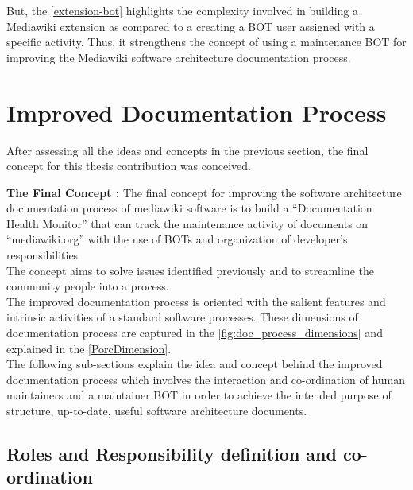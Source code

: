 \begin{enumerate}
But, the \autoref{extension-bot} highlights the complexity involved in building a Mediawiki extension as compared to a creating a BOT user assigned with a specific activity. Thus, it strengthens the concept of using a maintenance BOT for improving the Mediawiki software architecture documentation process.
\end{enumerate}

\section{Improved Documentation Process}
\indent After assessing all the ideas and concepts in the previous section, the final concept for this thesis contribution was conceived.

\textbf{The Final Concept : }
\newline
\indent The final concept for improving the software architecture documentation process of mediawiki software is to build  a \enquote{Documentation Health Monitor} that can track the maintenance activity of documents on \enquote{mediawiki.org} with the use of BOTs and organization of developer's responsibilities
\\\indent The concept aims to solve issues identified previously and to streamline the community people into a process.
\\\indent The improved documentation process is oriented with the salient features and intrinsic activities of a standard software processes. These dimensions of documentation process are captured in the \autoref{fig:doc_process_dimensions} and explained in the \autoref{PorcDimension}.
\\\indent The following sub-sections explain the idea and concept behind the improved documentation process which involves the interaction and co-ordination of human maintainers and a maintainer BOT in order to achieve the intended purpose of structure, up-to-date, useful software architecture documents.


\subsection{Roles and Responsibility definition and co-ordination}

